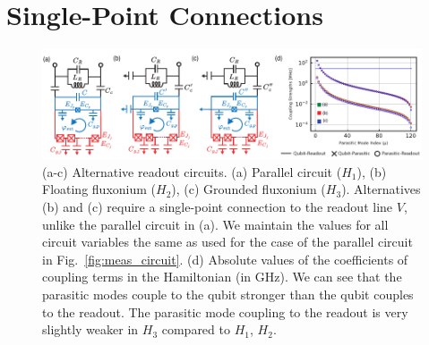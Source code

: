 \documentclass[%
reprint,
superscriptaddress,
 amsmath,amssymb,
 aps,
 prx,
longbibliography,
floatfix,
]{revtex4-2}
\begin{document}
\section{Single-Point Connections}\label{app:alt_circuits}
\begin{figure}[htb]
    \centering
    \includegraphics[width=\linewidth]{Supp_Fig/Circuit_choice.pdf}
    \caption{(a-c) Alternative readout circuits. (a) Parallel circuit ($H_1$), (b) Floating fluxonium ($H_2$), (c) Grounded fluxonium ($H_3$). Alternatives (b) and (c) require a single-point connection to the readout line $V$, unlike the parallel circuit in (a). We maintain the values for all circuit variables the same as used for the case of the parallel circuit in Fig.~\ref{fig:meas_circuit}. (d) Absolute values of the coefficients of coupling terms in the Hamiltonian (in GHz). We can see that the parasitic modes couple to the qubit stronger than the qubit couples to the readout. The parasitic mode coupling to the readout is very slightly weaker in $H_3$ compared to $H_1$, $H_2$.}
    \label{fig:circuit_choice}
\end{figure}
\end{document}
